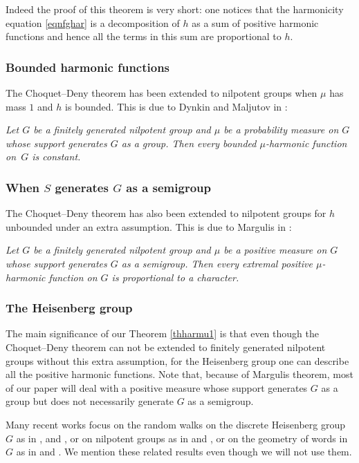\documentclass[11pt]{article}
\numberwithin{equation}{section}
\theoremstyle{definition}
\begin{document}
Indeed the proof of this theorem is very short:
one notices that the harmonicity equation \eqref{eqnfghar}
is a decomposition of $h$ as a sum of positive harmonic functions
and hence all the terms in this sum are proportional to $h$.

\subsubsection{Bounded harmonic functions}
The Choquet--Deny theorem has been extended to nilpotent
groups when $\mu$ has mass $1$
and $h$ is bounded. This is due to
Dynkin and Maljutov in \cite{DynkinMaljutov61}:

\emph{Let $G$ be a finitely generated nilpotent group
and $\mu$ be a probability measure on $G$
whose support generates $G$ as a group.
Then every bounded $\mu$-harmonic
function on~$G$ is constant.}

\subsubsection{When $S$ generates $G$ as a semigroup}
The Choquet--Deny theorem has also been extended to nilpotent
groups for $h$ unbounded under an extra assumption.
This is due to Margulis in \cite{Margulis66}:

\emph{Let $G$ be a finitely generated nilpotent group
and $\mu$ be a positive measure on $G$
whose support generates $G$ \emph{as a semigroup}.
Then every extremal positive $\mu$-harmonic
function on $G$ is proportional to a character.}

\subsubsection{The Heisenberg group}
The main significance of our Theorem \ref{thharmu1} is
that even though the Choquet--Deny theorem can not be
extended to finitely generated nilpotent groups
without this extra assumption, for the Heisenberg group
one can describe all the positive harmonic functions.
Note that, because of Margulis theorem,
most of our paper will deal
with a positive measure whose support
generates $G$ as a group but does not
necessarily generate $G$ as a semigroup.

Many recent works focus
on the random walks on the discrete Heisenberg group
$G$ as in
\cite{Breuillard05},
\cite{DiaconisHough15} and
\cite{GollSchmidtVerbitskiy16},
or on nilpotent groups as in \cite{Breuillard10}
and \cite{Guivarch71},
or on the geometry of words in $G$ as in
\cite{LindSchmidt15} and \cite{VershikMalyutin18}.
We mention these related results
even though we will not use them.
\end{document}
